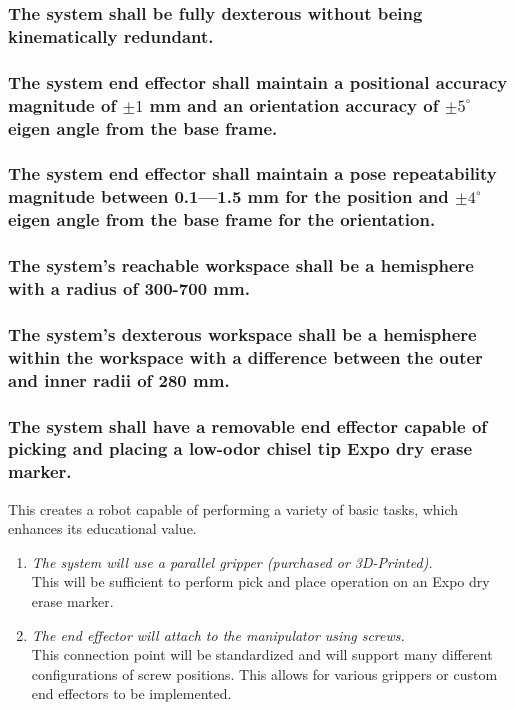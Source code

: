 \documentclass[12pt]{report}
\begin{document}
\subsubsection{The system shall be fully dexterous without being kinematically redundant.}
\subsubsection{The system end effector shall maintain a positional accuracy magnitude of \(\pm 1\) mm and an orientation accuracy of \(\pm 5^{\circ}\) eigen angle from the base frame.}
\subsubsection{The system end effector shall maintain a pose repeatability magnitude between 0.1—1.5 mm for the position and \(\pm 4^{\circ}\) eigen angle from the base frame for the orientation.}
\subsubsection{The system’s reachable workspace shall be a hemisphere with a radius of 300-700 mm.}
\subsubsection{The system’s dexterous workspace shall be a hemisphere within the workspace with a difference between the outer and inner radii of 280 mm.}
\subsubsection{The system shall have a removable end effector capable of picking and placing a low-odor chisel tip Expo dry erase marker.}
This creates a robot capable of performing a variety of basic tasks, which enhances its educational value.
\begin{enumerate}[label=\thesubsubsection\alph*.,leftmargin=3cm,font=\itshape]
  \item \textit{The system will use a parallel gripper (purchased or 3D-Printed).} \\
  This will be sufficient to perform pick and place operation on an Expo dry erase marker.
  \item \textit{The end effector will attach to the manipulator using screws.}\\
  This connection point will be standardized and will support many different configurations of screw positions. This allows for various grippers or custom end effectors to be implemented.
\end{enumerate}
\end{document}
